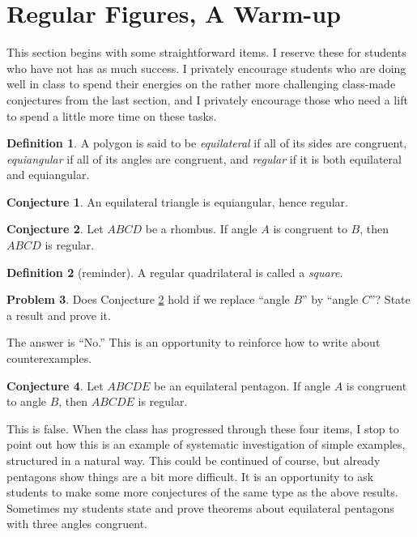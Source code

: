\documentclass{tufte-handout}
\theoremstyle{definition}
\newtheorem{problem}{Problem}[section]
\newtheorem{conjecture}[problem]{Conjecture}
\newtheorem*{definition}{Definition}
\begin{document}
\clearpage
\setcounter{section}{6}
\setcounter{problem}{0}
\section{Regular Figures, A Warm-up}

This section begins with some straightforward items. I reserve 
these for students who have not has as much success. I privately encourage students who are doing well in class to spend their energies on the rather more challenging class-made conjectures from the last section, and I privately encourage those who need a lift to spend a little more time on these tasks. 

\begin{definition}\label{defn:regular}
A polygon is said to be \emph{equilateral} if all of its sides are congruent, \emph{equiangular} if all of its angles are congruent, and \emph{regular} if it is both equilateral and equiangular.
\end{definition}

\begin{conjecture}\label{conj:equilateral-triangle}
An equilateral triangle is equiangular, hence regular.
\end{conjecture}

\begin{conjecture}\label{conj:regular-rhombus}
Let $ABCD$ be a rhombus. If angle $A$ is congruent to $B$, then $ABCD$ is regular.
\end{conjecture}

\begin{definition}[reminder]\label{defn:square}
A regular quadrilateral is called a \emph{square}.
\end{definition}


\begin{problem}\label{prob:equilateral-quad}
Does Conjecture \ref{conj:regular-rhombus} hold if we replace ``angle $B$'' by ``angle $C$''? State a result and prove it.
\end{problem}

The answer is ``No.'' This is an opportunity to reinforce how to write about counterexamples. 

\begin{conjecture}\label{conj:equilateral-pentagon}
Let $ABCDE$ be an equilateral pentagon. If angle $A$ is congruent to angle $B$, then $ABCDE$ is regular.
\end{conjecture}

This is false. When the class has progressed through these four items, I stop to point out how this is an example of 
systematic investigation of simple examples, structured in a natural way. This could be continued of course, but already pentagons show things are a bit more difficult. It is an opportunity to ask students to make some more conjectures of the same type as the above results. Sometimes my students state and prove theorems about equilateral pentagons with three angles congruent. 
\end{document}
